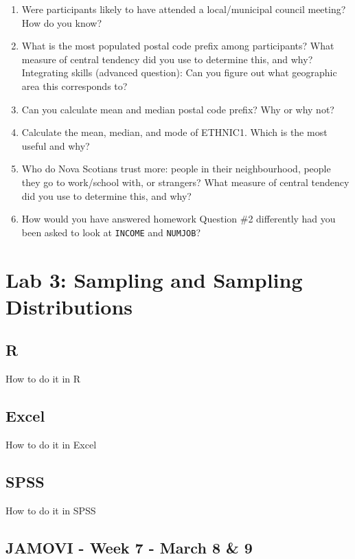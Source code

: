\documentclass[
]{book}
\begin{document}
\begin{enumerate}
\def\labelenumi{\arabic{enumi}.}
\item
  Were participants likely to have attended a local/municipal council meeting? How do you know?
\item
  What is the most populated postal code prefix among participants? What measure of central tendency did you use to determine this, and why? Integrating skills (advanced question): Can you figure out what geographic area this corresponds to?
\item
  Can you calculate mean and median postal code prefix? Why or why not?
\item
  Calculate the mean, median, and mode of ETHNIC1. Which is the most useful and why?
\item
  Who do Nova Scotians trust more: people in their neighbourhood, people they go to work/school with, or strangers? What measure of central tendency did you use to determine this, and why?
\item
  How would you have answered homework Question \#2 differently had you been asked to look at \texttt{INCOME} and \texttt{NUMJOB}?
\end{enumerate}

\hypertarget{lab-3-sampling-and-sampling-distributions}{%
\chapter{Lab 3: Sampling and Sampling Distributions}\label{lab-3-sampling-and-sampling-distributions}}

\hypertarget{r-3}{%
\section{R}\label{r-3}}

How to do it in R

\hypertarget{excel-3}{%
\section{Excel}\label{excel-3}}

How to do it in Excel

\hypertarget{spss-3}{%
\section{SPSS}\label{spss-3}}

How to do it in SPSS

\hypertarget{jamovi---week-7---march-8-9}{%
\section{JAMOVI - Week 7 - March 8 \& 9}\label{jamovi---week-7---march-8-9}}
\end{document}

